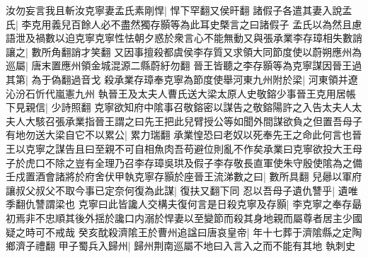汝勿妄言我且斬汝克寧妻孟氏素剛悍|{
	悍下罕翻又侯旰翻}
諸假子各遣其妻入說孟氏|{
	李克用義兒百餘人必不盡然獨存顥等為此耳史槩言之曰諸假子}
孟氏以為然且慮語泄及禍數以迫克寧克寧性怯朝夕惑於衆言心不能無動又與張承業李存璋相失數誚讓之|{
	數所角翻誚才笑翻}
又因事擅殺都虞侯李存質又求領大同節度使以蔚朔應州為巡屬|{
	唐末置應州領金城混源二縣蔚紆勿翻}
晉王皆聽之李存顥等為克寧謀因晉王過其第|{
	為于偽翻過音戈}
殺承業存璋奉克寧為節度使舉河東九州附於梁|{
	河東領并遼沁汾石忻代嵐憲九州}
執晉王及太夫人曹氏送大梁太原人史敬鎔少事晉王克用居帳下見親信|{
	少詩照翻}
克寧欲知府中隂事召敬鎔密以謀告之敬鎔陽許之入告太夫人太夫人大駭召張承業指晉王謂之曰先王把此兒臂授公等如聞外間謀欲負之但置吾母子有地勿送大梁自它不以累公|{
	累力瑞翻}
承業惶恐曰老奴以死奉先王之命此何言也晉王以克寧之謀告且曰至親不可自相魚肉吾苟避位則亂不作矣承業曰克寧欲投大王母子於虎口不除之豈有全理乃召李存璋吳珙及假子李存敬長直軍使朱守殷使隂為之備壬戍置酒會諸將於府舍伏甲執克寧存顥於座晉王流涕數之曰|{
	數所具翻}
兒曏以軍府讓叔父叔父不取今事已定奈何復為此謀|{
	復扶又翻下同}
忍以吾母子遺仇讐乎|{
	遺唯季翻仇讐謂梁也}
克寧曰此皆讒人交構夫復何言是日殺克寧及存顥|{
	李克寧之奉存朂初焉非不忠順其後外揺於讒口内溺於悍妻以至變節而殺其身地親而屬尊者居主少國疑之時可不戒哉}
癸亥酖殺濟隂王於曹州追諡曰唐哀皇帝|{
	年十七葬于濟隂縣之定陶鄉濟子禮翻}
甲子蜀兵入歸州|{
	歸州荆南巡屬不地曰入言入之而不能有其地}
執刺史

